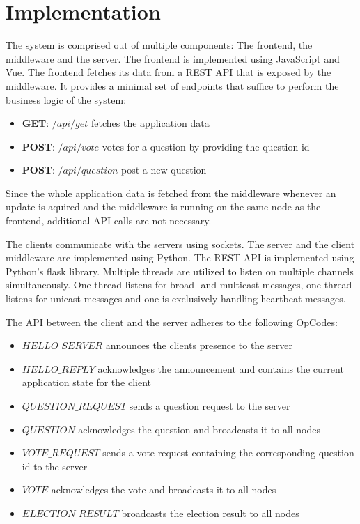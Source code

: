 \documentclass[runningheads]{llncs}
\begin{document}
\section{Implementation}

The system is comprised out of multiple components: The frontend, the
middleware and the server. The frontend is implemented using JavaScript and
Vue. The frontend fetches its data from a REST API that is exposed by the
middleware. It provides a minimal set of endpoints that suffice to perform the
business logic of the system: 

\begin{itemize}
    \item \textbf{GET}: $/api/get$ fetches the application data
    \item \textbf{POST}: $/api/vote$ votes for a question by providing the question id
    \item \textbf{POST}: $/api/question$ post a new question
\end{itemize}

Since the whole application data is fetched from the middleware whenever an
update is aquired and the middleware is running on the same node as the
frontend, additional API calls are not necessary.

The clients communicate with the servers using sockets. The server and the
client middleware are implemented using Python. The REST API is implemented
using Python's flask library. Multiple threads are utilized to listen on
multiple channels simultaneously. One thread listens for broad- and multicast
messages, one thread listens for unicast messages and one is exclusively
handling heartbeat messages.

The API between the client and the server adheres to the following OpCodes:

\begin{itemize}
    \item \textbf{$HELLO\_SERVER$} announces the clients presence to the server 
    \item \textbf{$HELLO\_REPLY$} acknowledges the announcement and contains the current application state for the client
    \item \textbf{$QUESTION\_REQUEST$} sends a question request to the server
    \item \textbf{$QUESTION$} acknowledges the question and broadcasts it to all nodes
    \item \textbf{$VOTE\_REQUEST$} sends a vote request containing the corresponding question id to the server
    \item \textbf{$VOTE$} acknowledges the vote and broadcasts it to all nodes
    \item \textbf{$ELECTION\_RESULT$} broadcasts the election result to all nodes
\end{itemize}
\end{document}

